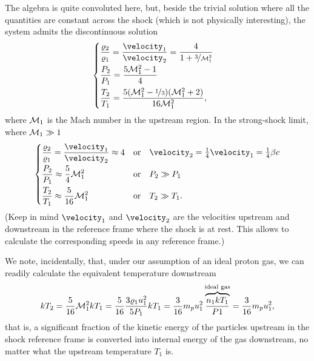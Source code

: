 The algebra is quite convoluted here, but, beside the trivial solution where all
the quantities are constant across the shock (which is not physically interesting),
the system admits the discontinuous solution
\begin{align*}
  \begin{cases}
  \displaystyle\frac{\density_2}{\density_1} = \frac{\velocity_1}{\velocity_2} =
    \frac{4}{1 + \nicefrac{3}{\machnum_1^2}}\\[8pt]
  \displaystyle\frac{\pressure_2}{\pressure_1} =
    \frac{5 \machnum_1^2 - 1}{4}\\[8pt]
  \displaystyle\frac{T_2}{T_1} =
    \frac{5 (\machnum_1^2 - \nicefrac{1}{3}) (\machnum_1^2 + 2)}{16 \machnum_1^2},
  \end{cases}
\end{align*}
where $\mathcal{M}_1$ is the Mach number in the upstream region. In the strong-shock
limit, where $\mathcal{M}_1 \gg 1$
\begin{align}\label{eq:shock_acceleration_conditions}
  \begin{cases}
  \displaystyle\frac{\density_2}{\density_1} =
  \frac{\velocity_1}{\velocity_2} \approx 4
  & \text{or}\quad \velocity_2 = \frac{1}{4}\velocity_1  = \frac{1}{4} \beta c\\[8pt]
  \displaystyle\frac{\pressure_2}{\pressure_1} \approx \frac{5}{4}\machnum_1^2
  & \text{or}\quad \pressure_2 \gg \pressure_1 \\[8pt]
  \displaystyle\frac{T_2}{T_1} \approx \frac{5}{16}\machnum_1^2
  & \text{or}\quad T_2 \gg T_1.
  \end{cases}
\end{align}
(Keep in mind $\velocity_1$ and $\velocity_2$ are the velocities upstream and
downstream in the reference frame where the shock is at rest. This allows to calculate
the corresponding speeds in any reference frame.)

We note, incidentally, that, under our assumption of an ideal proton gas, we can
readily calculate the equivalent temperature downstream
\begin{align*}
  kT_2 = \frac{5}{16} \mathcal{M}_1^2 kT_1 =
  \frac{5}{16} \frac{3 \varrho_1 u_1^2}{5 P_1} kT_1 =
  \frac{3}{16} m_p u_1^2 \overbrace{\frac{n_1 kT_1}{P 1}}^{\text{ideal gas}} =
  \frac{3}{16} m_p u_1^2,
\end{align*}
that is, a significant fraction of the kinetic energy of the particles upstream
in the shock reference frame is converted into internal energy of the gas downstream,
no matter what the upstream temperature $T_1$ is.

